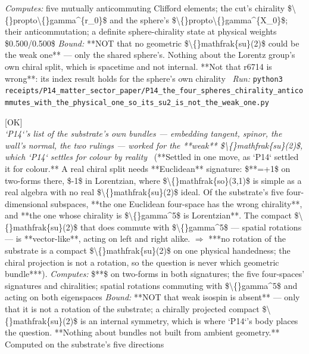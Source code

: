 \begin{description}
\emph{Computes:} five mutually anticommuting Clifford elements; the cut's chirality \$\textbackslash\{\}propto\textbackslash\{\}gamma\textasciicircum{}\{r\_0\}\$ and the sphere's \$\textbackslash\{\}propto\textbackslash\{\}gamma\textasciicircum{}\{X\_0\}\$; their anticommutation; a definite sphere-chirality state at physical weights \$0.500/0.500\$
 \emph{Bound:}  **NOT that no geometric \$\textbackslash\{\}mathfrak\{su\}(2)\$ could be the weak one** --- only the shared sphere's. Nothing about the Lorentz group's own chiral split, which is spacetime and not internal. **Not that r6714 is wrong**: its index result holds for the sphere's own chirality
\ \emph{Run:} \texttt{python3 receipts/P14\_matter\_sector\_paper/P14\_the\_four\_spheres\_chirality\_anticommutes\_with\_the\_physical\_one\_so\_its\_su2\_is\_not\_the\_weak\_one.py}
\item[\rcptlabel{P14_no_rotation_of_the_substrate_is_a_compact_chiral_su2}{P14R87}\textbf{P14R87}\quad\texttt{P14\_no\_rotation\_of\_the\_substrate\_is\_a\_compact\_chiral\_su2}]\hfill\textsf{[OK]}\\
\textit{`P14`'s list of the substrate's own bundles --- embedding tangent, spinor, the wall's normal, the two rulings --- worked for the **weak** \$\textbackslash\{\}mathfrak\{su\}(2)\$, which `P14` settles for colour by reality} \ (**Settled in one move, as `P14` settled it for colour.** A real chiral split needs **Euclidean** signature: \$**=+1\$ on two-forms there, \$-1\$ in Lorentzian, where \$\textbackslash\{\}mathfrak\{so\}(3,1)\$ is simple as a real algebra with no real \$\textbackslash\{\}mathfrak\{su\}(2)\$ ideal.  Of the substrate's five four-dimensional subspaces, **the one Euclidean four-space has the wrong chirality**, and **the one whose chirality is \$\textbackslash\{\}gamma\textasciicircum{}5\$ is Lorentzian**.  The compact \$\textbackslash\{\}mathfrak\{su\}(2)\$ that does commute with \$\textbackslash\{\}gamma\textasciicircum{}5\$ --- spatial rotations --- is **vector-like**, acting on left and right alike. \ensuremath{\Rightarrow} ***no rotation of the substrate is a compact \$\textbackslash\{\}mathfrak\{su\}(2)\$ on one physical handedness; the chiral projection is not a rotation, so the question is never which geometric bundle***). 
\emph{Computes:} \$**\$ on two-forms in both signatures; the five four-spaces' signatures and chiralities; spatial rotations commuting with \$\textbackslash\{\}gamma\textasciicircum{}5\$ and acting on both eigenspaces
 \emph{Bound:}  **NOT that weak isospin is absent** --- only that it is not a rotation of the substrate; a chirally projected compact \$\textbackslash\{\}mathfrak\{su\}(2)\$ is an internal symmetry, which is where `P14`'s body places the question. **Nothing about bundles not built from ambient geometry.** Computed on the substrate's five directions

\end{description}
